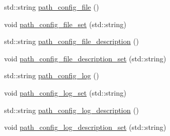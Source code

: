 \begin{DoxyCompactItemize}
\item 
std\+::string \hyperlink{class_config___settings_af0f52cc1553876cd59e3a27e8959547b}{path\+\_\+config\+\_\+file} ()
\item 
void \hyperlink{class_config___settings_ae75019352dae31e6b9a9436b3adaa3d0}{path\+\_\+config\+\_\+file\+\_\+set} (std\+::string)
\item 
std\+::string \hyperlink{class_config___settings_ac33b48099b7cdba852eb61b9459ce3ab}{path\+\_\+config\+\_\+file\+\_\+description} ()
\item 
void \hyperlink{class_config___settings_a7e673d5a4ce0875cb7f60b74b5c59aa4}{path\+\_\+config\+\_\+file\+\_\+description\+\_\+set} (std\+::string)
\item 
std\+::string \hyperlink{class_config___settings_a9b063dcebe6fac41f923e99225a3c27b}{path\+\_\+config\+\_\+log} ()
\item 
void \hyperlink{class_config___settings_a6bf8dc0bd1b6504cab6407ca10249a93}{path\+\_\+config\+\_\+log\+\_\+set} (std\+::string)
\item 
std\+::string \hyperlink{class_config___settings_a09b00ca2ea66d3faa9f43c8e56831cee}{path\+\_\+config\+\_\+log\+\_\+description} ()
\item 
void \hyperlink{class_config___settings_a88176fb9973d013cbb761f9197743ae5}{path\+\_\+config\+\_\+log\+\_\+description\+\_\+set} (std\+::string)
\end{DoxyCompactItemize}
